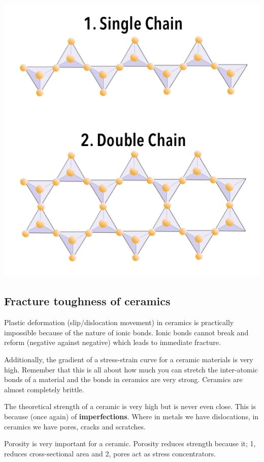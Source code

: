 \documentclass[12pt]{article}
\begin{document}
\includegraphics[scale=0.2]{silicatestructure}

\subsection{Fracture toughness of ceramics}
Plastic deformation (slip/dislocation movement) in ceramics is practically impossible because of the nature of ionic bonds.
Ionic bonds cannot break and reform (negative against negative) which leads to immediate fracture. 

Additionally, the gradient of a stress-strain curve for a ceramic materials is very high.
Remember that this is all about how much you can stretch the inter-atomic bonds of a material and the bonds in ceramics are very strong.
Ceramics are almost completely brittle.

The theoretical strength of a ceramic is very high but is never even close.
This is because (once again) of \textbf{imperfections}. 
Where in metals we have dislocations, in ceramics we have pores, cracks and scratches.

Porosity is very important for a ceramic.
Porosity reduces strength because it; 1, reduces cross-sectional area and 2, pores act as stress concentrators. 
\end{document}

